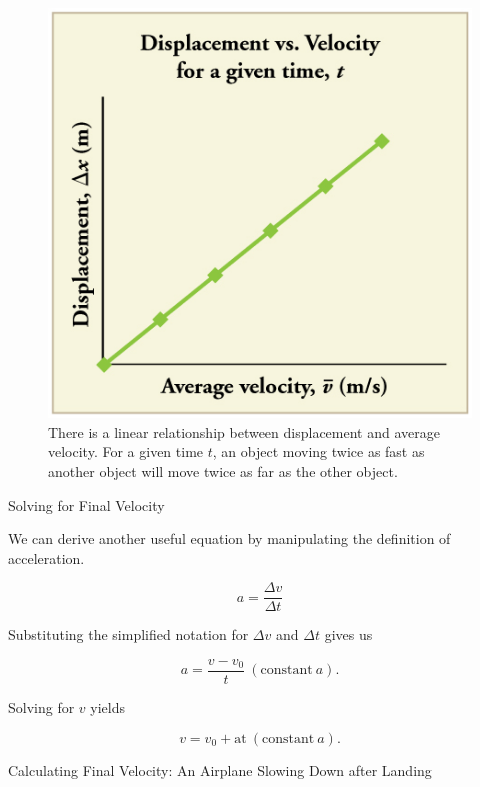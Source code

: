 \documentclass[
]{book}
\begin{document}
\begin{figure}
\hypertarget{import-auto-id1962019}{%
\centering
\includegraphics{images/Figure_02_05_00b.jpg}
\caption{There is a linear relationship between displacement and average
velocity. For a given time \(t{}\), an object moving twice as fast as
another object will move twice as far as the other
object.}\label{import-auto-id1962019}
}
\end{figure}

\hypertarget{fs-id1164906431223}{}
Solving for Final Velocity

We can derive another useful equation by manipulating the definition of
acceleration.

\leavevmode{}%
\[a = \frac{\Delta v}{\Delta t}\]

Substituting the simplified notation for \({\Delta v}{}\) and \(\Delta t\)
gives us

\leavevmode{}%
\[{{a = \frac{v - v_{0}}{t}}\ (\text{constant}\ a)\text{.}}{}\]

Solving for \(v{}\) yields

\leavevmode{}%
\[{{v = {v_{0} + \text{at}}}\ (\text{constant}\ a)\text{.}}{}\]

\hypertarget{fs-id1164906431414}{}
Calculating Final Velocity: An Airplane Slowing Down after Landing
\end{document}
